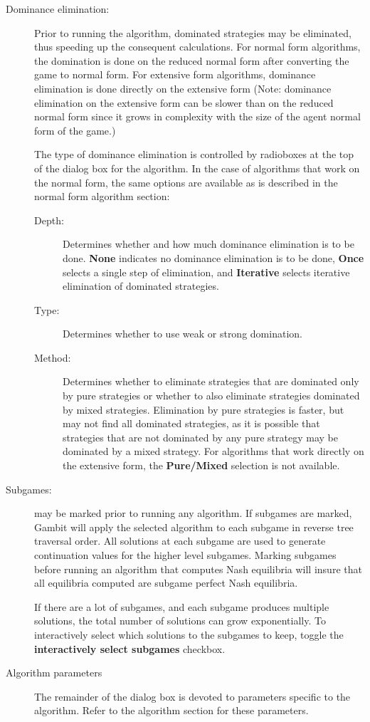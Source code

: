 \begin{description}
\item[Dominance elimination:] Prior to running the algorithm, dominated
strategies may be eliminated, thus speeding up the consequent
calculations.  For normal form algorithms, the domination is done on
the reduced normal form after converting the game to normal form.  For
extensive form algorithms, dominance elimination is done directly on
the extensive form (Note: dominance elimination on the extensive form
can be slower than on the reduced normal form since it grows in
complexity with the size of the agent normal form of the game.)

The type of dominance elimination is controlled by radioboxes at the
top of the dialog box for the algorithm.  In the case of algorithms
that work on the normal form, the same options are available as is
described in the normal form algorithm section:
\begin{description}
\item[Depth:] Determines whether and how much dominance elimination is
to be done.  {\bf None} indicates no dominance elimination is to be
done, {\bf Once} selects a single step of elimination, and {\bf 
Iterative} selects iterative elimination of dominated strategies.
\item[Type:] Determines whether to use weak or strong domination.
\item[Method:] Determines whether to eliminate strategies that are
dominated only by pure strategies or whether to also eliminate
strategies dominated by mixed strategies.  Elimination by pure
strategies is faster, but may not find all dominated strategies, as it
is possible that strategies that are not dominated by any pure
strategy may be dominated by a mixed strategy.  For algorithms that
work directly on the extensive form, the {\bf Pure/Mixed} selection is
not available.

\end{description}

\item[Subgames:]  may be marked prior
to running any algorithm.  If subgames are marked, Gambit will apply
the selected algorithm to each subgame in reverse tree traversal
order.  All solutions at each subgame are used to generate
continuation values for the higher level subgames.  Marking subgames
before running an algorithm that computes Nash equilibria will insure
that all equilibria computed are subgame perfect Nash equilibria.

If there are a lot of subgames, and each subgame produces multiple 
solutions, the total number of solutions can grow exponentially.  
To interactively select which solutions to the subgames to keep, toggle 
the {\bf interactively select subgames} checkbox.  

\item[Algorithm parameters] The remainder of the dialog box is devoted
to parameters specific to the algorithm. Refer to the algorithm
section for these parameters.

\end{description}

